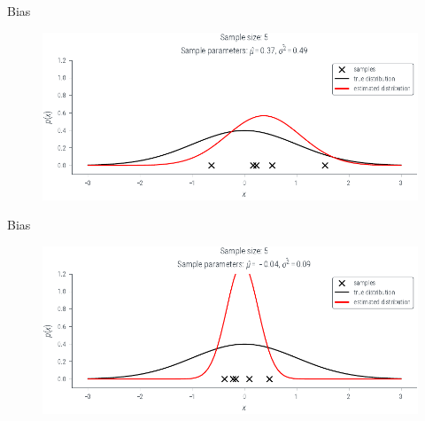 \documentclass[handout]{beamer}
\begin{document}
             \begin{frame}{Bias }
            \begin{figure}
                \includegraphics{../figures/mle/biased-mle-normal-5-4.pdf}
            \end{figure}
            
        \end{frame}

             \begin{frame}{Bias }
            \begin{figure}
                \includegraphics{../figures/mle/biased-mle-normal-5-5.pdf}
            \end{figure}
            
        \end{frame}


    

    


    
\end{document}
